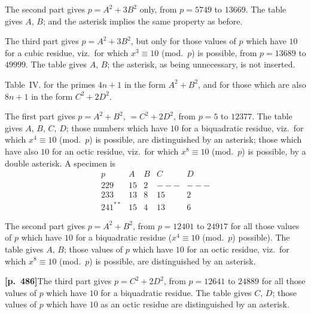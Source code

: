 \documentclass[11pt,a4paper]{article}
\begin{document}
The second part gives $p = A^{2} + 3B^{2}$ only, from $p = 5749$ to $13669$. The table gives $A$, $B$; and the asterisk implies the same property as before.

The third part gives $p = A^{2} + 3B^{2}$, but only for those values of $p$ which have $10$ for a cubic residue, viz.\ for which $x^{3} \equiv 10$ (mod.~$p$) is possible, from $p = 13689$ to $49999$. The table gives $A$, $B$; the asterisk, as being unnecessary, is not inserted.

Table~IV. for the primes $4n + 1$ in the form $A^{2} + B^{2}$, and for those which are also $8n + 1$ in the form $C^{2} + 2D^{2}$.

The first part gives $p = A^{2} + B^{2}$, $= C^{2} + 2D^{2}$, from $p = 5$ to $12377$. The table gives $A$, $B$, $C$, $D$; those numbers which have $10$ for a biquadratic residue, viz.\ for which $x^{4} \equiv 10$ (mod.~$p$) is possible, are distinguished by an asterisk; those which have also $10$ for an octic residue, viz.\ for which $x^{8} \equiv 10$ (mod.~$p$) is possible, by a double asterisk. A specimen is
\[
\begin{array}{c|cccc}
p & A & B & C & D \\
\hline
229   & 15 & 2 & --- & --- \\
233   & 13 & 8 & 15 & 2 \\
241^{**} & 15 & 4 & 13 & 6
\end{array}
\]

The second part gives $p = A^{2} + B^{2}$, from $p = 12401$ to $24917$ for all those values of $p$ which have $10$ for a biquadratic residue ($x^{4} \equiv 10$ (mod.~$p$) possible). The table gives $A$, $B$; those values of $p$ which have $10$ for an octic residue, viz.\ for which $x^{8} \equiv 10$ (mod.~$p$) is possible, are distinguished by an asterisk.

\noindent\textbf{[p.~486]}\quad The third part gives $p = C^{2} + 2D^{2}$, from $p = 12641$ to $24889$ for all those values of $p$ which have $10$ for a biquadratic residue. The table gives $C$, $D$; those values of $p$ which have $10$ as an octic residue are distinguished by an asterisk.
\end{document}
